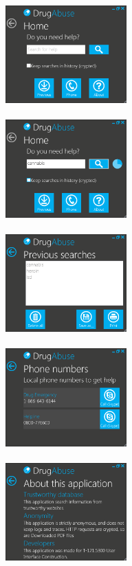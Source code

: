 \documentclass[a4paper,12pt, twocolumn]{article}
\begin{document}
\begin{center}
\includegraphics[width=0.35\textwidth]{images/desktop_screen_home.png}
\label{desktop_home}
~\\~\\

\includegraphics[width=0.35\textwidth]{images/desktop_screen_home_dl.png}
\label{desktop_dl}
~\\~\\

\includegraphics[width=0.35\textwidth]{images/desktop_screen_previous.png}
\label{desktop_previous}
~\\~\\

\includegraphics[width=0.35\textwidth]{images/desktop_screen_phone.png}
\label{desktop_phone}
~\\~\\

\includegraphics[width=0.35\textwidth]{images/desktop_screen_about.png}
\label{desktop_about}
\end{center}
\end{document}
